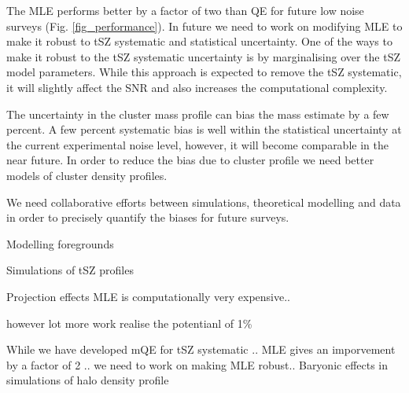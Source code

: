 The MLE performs better by a factor of two than QE for future low noise surveys (Fig. \ref{fig_performance}). 
In future we need to work on modifying MLE to make it robust to tSZ systematic and statistical uncertainty. 
One of the ways to make it robust to the tSZ systematic uncertainty is by marginalising over the tSZ model parameters. 	
While this approach is expected to remove the tSZ systematic, it will slightly affect the SNR and also increases the computational complexity. 

The uncertainty in the cluster mass profile can bias the mass estimate by a few percent. 
A few percent systematic bias is well within the statistical uncertainty at the current experimental noise level, however, it will become comparable in the near future. 
In order to reduce the bias due to cluster profile we need better models of cluster density profiles.

We need collaborative efforts between simulations, theoretical modelling and data in order to precisely quantify the biases for future surveys.

Modelling foregrounds 

Simulations of tSZ profiles

Projection effects
MLE is computationally very expensive.. 

however lot more work realise the potentianl of 1\% 

While we have developed mQE for tSZ systematic ..
MLE gives an imporvement by a factor of 2 ..
we need to work on making MLE robust.. 
Baryonic effects in simulations of halo density profile


